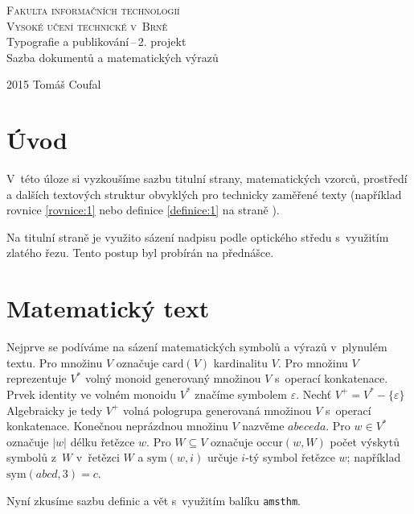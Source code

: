 \documentclass[a4paper, 11pt]{article}
\theoremstyle{plain}
\theoremstyle{definition}
\theoremstyle{plain}
\begin{document}
\thispagestyle{empty}
\begin{center}
  {\Huge\textsc{Fakulta informačních technologií}} \\
  {\Huge\textsc{Vysoké učení technické v~Brně}} \\
  {\LARGE{Typografie a publikování\,--\,2. projekt}} \\
  {\LARGE{Sazba dokumentů a matematických výrazů}}
\end{center}
{\Large{2015 \hfill Tomáš Coufal}}
\cleardoublepage
\setcounter{page}{1}
\twocolumn
\section*{Úvod}\label{strana:1}

V~této úloze si vyzkoušíme sazbu titulní strany, matematických vzorců, prostředí a dalších textových struktur obvyklých pro technicky zaměřené texty (například rovnice \eqref{rovnice:1} nebo definice \ref{definice:1} na straně \pageref{strana:1}).

Na titulní straně je využito sázení nadpisu podle optického středu s~využitím zlatého řezu. Tento postup byl probírán na přednášce.

\section{Matematický text}
Nejprve se podíváme na sázení matematických symbolů a výrazů v~plynulém textu. Pro množinu $V$ označuje $\text{card}(V)$ kardinalitu $V$.
Pro množinu $V$ reprezentuje $V^*$ volný monoid generovaný množinou $V$ s~operací konkatenace.
Prvek identity ve volném monoidu $V^*$ značíme symbolem $\varepsilon$.
Nechť $V^+ = V^* - \{ {\varepsilon} \}$ Algebraicky je tedy $V^+$ volná pologrupa generovaná množinou $V$ s~operací konkatenace.
Konečnou neprázdnou množinu $V$ nazvěme $abeceda$.
Pro $w \in V^*$ označuje $|w|$ délku řetězce $w$. Pro $W \subseteq V$ označuje $\text{occur}(w,W)$ počet výskytů symbolů z~$W$ v~řetězci $W$ a $\text{sym}(w,i)$ určuje $i$-tý symbol řetězce $w$; například $\text{sym}(abcd,3) = c$.

Nyní zkusíme sazbu definic a vět s~využitím balíku \verb|amsthm|.
\end{document}
